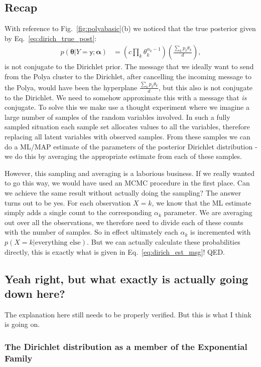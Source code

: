\documentclass[oneside,english]{scrbook}
\begin{document}
\subsection{Recap}
With reference to Fig.~\ref{fig:polyabasic}(b) we noticed that the
true posterior given by Eq.~\ref{eq:dirich_true_post}:
\begin{align}
  p(\bm{\theta}|Y=\mathsf{y};\bm{\alpha})
  &= \left(c\prod_k\theta_k^{\alpha_k-1}\right)\left(\frac{\sum_kp_k\theta_k}{d}\right), \nonumber
\end{align}
is not conjugate to the Dirichlet prior. The message that we ideally
want to send from the Polya cluster to the Dirichlet, after cancelling
the incoming message to the Polya, would have been the hyperplane
$\frac{\sum_kp_k\theta_k}{d}$, but this also is not conjugate to the
Dirichlet. We need to somehow approximate this with a message that
\emph{is} conjugate. To solve this we make use a thought experiment
where we imagine a large number of samples of the random variables
involved. In such a fully sampled situation each sample set allocates
values to all the variables, therefore replacing all latent variables
with observed samples. From these samples we can do a ML/MAP estimate
of the parameters of the posterior Dirichlet distribution - we do this
by averaging the appropriate estimate from each of these samples.

However, this sampling and averaging is a laborious business. If we
really wanted to go this way, we would have used an MCMC procedure in
the first place. Can we achieve the same result without actually doing
the sampling? The answer turns out to be yes. For each observation
$X=k$, we know that the ML estimate simply adds a single count to the
corresponding $\alpha_k$ parameter. We are averaging out over all the
observations, we therefore need to divide each of these counts with
the number of samples. So in effect ultimately each $\alpha_k$ is
incremented with $p(X=k|\text{everything else})$. But we can actually
calculate these probabilities directly, this is exactly what is given
in Eq.~\ref{eq:dirich_est_msg}! QED.

\subsection{Yeah right, but what exactly is actually going down here?}
The explanation here still needs to be properly verified. But this is
what I think is going on.

\subsubsection{The Dirichlet distribution as a member of the Exponential Family}
\end{document}

